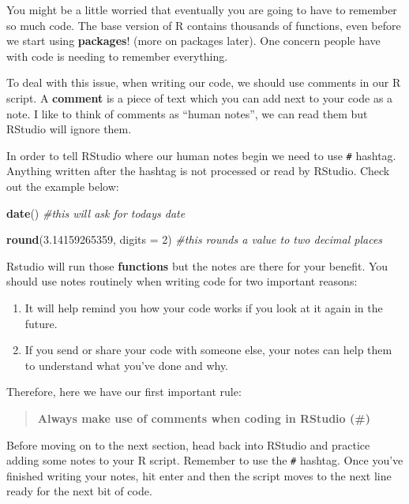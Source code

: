 \documentclass[
]{book}
\newenvironment{Shaded}{\begin{snugshade}}{\end{snugshade}}
\newcommand{\AttributeTok}[1]{\textcolor[rgb]{0.13,0.29,0.53}{#1}}
\newcommand{\CommentTok}[1]{\textcolor[rgb]{0.56,0.35,0.01}{\textit{#1}}}
\newcommand{\DecValTok}[1]{\textcolor[rgb]{0.00,0.00,0.81}{#1}}
\newcommand{\FloatTok}[1]{\textcolor[rgb]{0.00,0.00,0.81}{#1}}
\newcommand{\FunctionTok}[1]{\textcolor[rgb]{0.13,0.29,0.53}{\textbf{#1}}}
\newcommand{\NormalTok}[1]{#1}
\begin{document}
You might be a little worried that eventually you are going to have to remember so much code. The base version of R contains thousands of functions, even before we start using \textbf{packages}! (more on packages later). One concern people have with code is needing to remember everything.

To deal with this issue, when writing our code, we should use comments in our R script. A \textbf{comment} is a piece of text which you can add next to your code as a note. I like to think of comments as ``human notes'', we can read them but RStudio will ignore them.

In order to tell RStudio where our human notes begin we need to use \texttt{\#} hashtag. Anything written after the hashtag is not processed or read by RStudio. Check out the example below:

\begin{Shaded}
\begin{Highlighting}[]
\FunctionTok{date}\NormalTok{() }\CommentTok{\#this will ask for today\textquotesingle{}s date}

\FunctionTok{round}\NormalTok{(}\FloatTok{3.14159265359}\NormalTok{, }\AttributeTok{digits =} \DecValTok{2}\NormalTok{) }\CommentTok{\#this rounds a value to two decimal places}
\end{Highlighting}
\end{Shaded}

Rstudio will run those \textbf{functions} but the notes are there for your benefit. You should use notes routinely when writing code for two important reasons:

\begin{enumerate}
\def\labelenumi{\arabic{enumi}.}
\item
  It will help remind you how your code works if you look at it again in the future.
\item
  If you send or share your code with someone else, your notes can help them to understand what you've done and why.
\end{enumerate}

Therefore, here we have our first important rule:

\begin{quote}
\textbf{Always make use of comments when coding in RStudio (\#)}
\end{quote}

Before moving on to the next section, head back into RStudio and practice adding some notes to your R script. Remember to use the \texttt{\#} hashtag. Once you've finished writing your notes, hit enter and then the script moves to the next line ready for the next bit of code.
\end{document}
